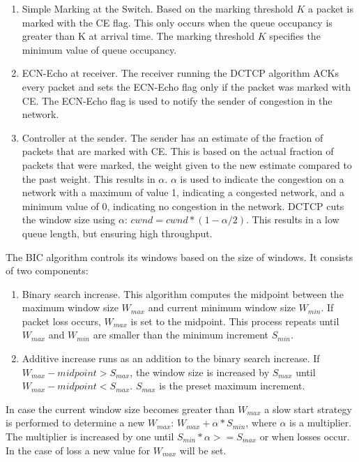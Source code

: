 \documentclass{article}
\begin{document}
\begin{enumerate}
	\item Simple Marking at the Switch. Based on the marking threshold $K$ a packet is marked with the CE flag. This only occurs when the queue occupancy is greater than K at arrival time. The marking threshold $K$ specifies the minimum value of queue occupancy.
	\item ECN-Echo at receiver. The receiver running the DCTCP algorithm ACKs every packet and sets the ECN-Echo flag only if the packet was marked with CE. The ECN-Echo flag is used to notify the sender of congestion in the network.
	\item Controller at the sender. The sender has an estimate of the fraction of packets that are marked with CE. This is based on the actual fraction of packets that were marked, the weight given to the new estimate compared to the past weight. This results in $\alpha$. $\alpha$ is used to indicate the congestion on a network with a maximum of value 1, indicating a congested network, and a minimum value of 0, indicating no congestion in the network. DCTCP cuts the window size using $\alpha$: $cwnd = cwnd * (1 - \alpha/2)$. This results in a low queue length, but ensuring high throughput.\\
\end{enumerate}

The BIC algorithm controls its windows based on the size of windows\cite{bic-tcp-congestion}. It consists of two components:

\begin{enumerate}
	\item Binary search increase. This algorithm computes the midpoint between the maximum window size $W_{max}$ and current minimum window size $W_{min}$. If packet loss occurs, $W_{max}$ is set to the midpoint. This process repeats until $W_{max}$ and $W_{min}$ are smaller than the minimum increment $S_{min}$.
	\item Additive increase runs as an addition to the binary search increase. If $W_{max} - midpoint > S_{max}$, the window size is increased by $S_{max}$ until $W_{max} - midpoint < S_{max}$. $S_{max}$ is the preset maximum increment.
\end{enumerate}
In case the current window size becomes greater than $W_{max}$ a slow start strategy is performed to determine a new $W_{max}$: $W_{max} + \alpha * S_{min}$, where $\alpha$ is a multiplier. The multiplier is increased by one until $S_{min} * \alpha >= S_{max}$ or when losses occur. In the case of loss a new value for $W_{max}$ will be set.
\end{document}
